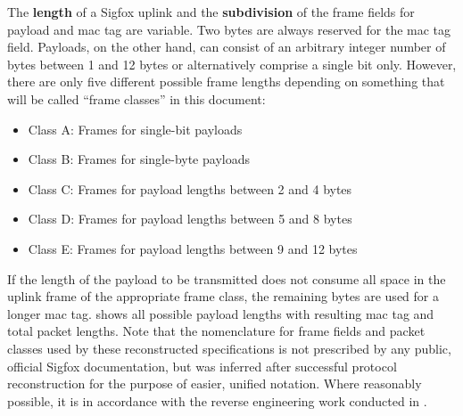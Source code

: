 The \textbf{length} of a Sigfox uplink and the \textbf{subdivision} of the frame fields for payload and \gls{mac} tag are variable.
Two bytes are always reserved for the \gls{mac} tag field.
Payloads, on the other hand, can consist of an arbitrary integer number of bytes between 1 and 12 bytes or alternatively comprise a single bit only.
However, there are only five different possible frame lengths depending on something that will be called ``frame classes'' in this document:
\begin{itemize}
\item Class A: Frames for single-bit payloads
\item Class B: Frames for single-byte payloads
\item Class C: Frames for payload lengths between 2 and 4 bytes
\item Class D: Frames for payload lengths between 5 and 8 bytes
\item Class E: Frames for payload lengths between 9 and 12 bytes
\end{itemize}
If the length of the payload to be transmitted does not consume all space in the uplink frame of the appropriate frame class, the remaining bytes are used for a longer \gls{mac} tag.
 shows all possible payload lengths with resulting \gls{mac} tag and total packet lengths.
Note that the nomenclature for frame fields and packet classes used by these reconstructed specifications is not prescribed by any public, official Sigfox documentation, but was inferred after successful protocol reconstruction for the purpose of easier, unified notation.
Where reasonably possible, it is in accordance with the reverse engineering work conducted in \cite{disk91radioprotocol}.

